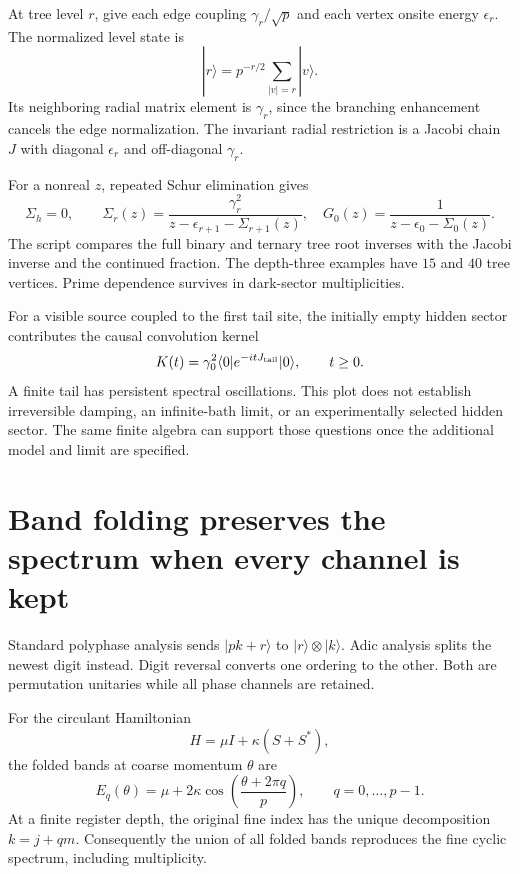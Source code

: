 At tree level $r$, give each edge coupling $\gamma_r/\sqrt p$ and each vertex onsite energy $\epsilon_r$. The normalized level state is
\[
|r\rangle=p^{-r/2}\sum_{|v|=r}|v\rangle.
\]
Its neighboring radial matrix element is $\gamma_r$, since the branching enhancement cancels the edge normalization. The invariant radial restriction is a Jacobi chain $J$ with diagonal $\epsilon_r$ and off-diagonal $\gamma_r$.

For a nonreal $z$, repeated Schur elimination gives
\[
\Sigma_h=0,\qquad
\Sigma_r(z)=\frac{\gamma_r^2}{z-\epsilon_{r+1}-\Sigma_{r+1}(z)},
\quad
G_0(z)=\frac1{z-\epsilon_0-\Sigma_0(z)}.
\]
The script compares the full binary and ternary tree root inverses with the Jacobi inverse and the continued fraction. The depth-three examples have $15$ and $40$ tree vertices. Prime dependence survives in dark-sector multiplicities.

For a visible source coupled to the first tail site, the initially empty hidden sector contributes the causal convolution kernel
\[
K(t)=\gamma_0^2\langle0|e^{-itJ_{\rm tail}}|0\rangle,\qquad t\ge0.
\]
A finite tail has persistent spectral oscillations. This plot does not establish irreversible damping, an infinite-bath limit, or an experimentally selected hidden sector. The same finite algebra can support those questions once the additional model and limit are specified.



\clearpage
\section{Band folding preserves the spectrum when every channel is kept}

Standard polyphase analysis sends $|pk+r\rangle$ to $|r\rangle\otimes|k\rangle$. Adic analysis splits the newest digit instead. Digit reversal converts one ordering to the other. Both are permutation unitaries while all phase channels are retained.

For the circulant Hamiltonian
\[
H=\mu I+\kappa(S+S^*),
\]
the folded bands at coarse momentum $\theta$ are
\[
E_q(\theta)=\mu+2\kappa\cos\!\left(\frac{\theta+2\pi q}{p}\right),
\qquad q=0,\ldots,p-1.
\]
At a finite register depth, the original fine index has the unique decomposition $k=j+qm$. Consequently the union of all folded bands reproduces the fine cyclic spectrum, including multiplicity.

